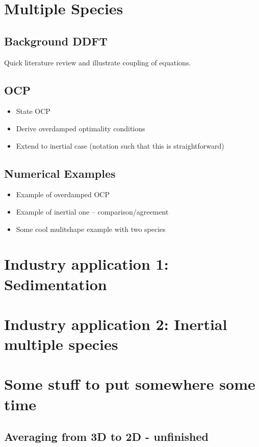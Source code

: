 \documentclass[11pt, a4paper]{article}
\theoremstyle{definition}
\begin{document}
	\section{Multiple Species}
	
	\subsection{Background DDFT}
	Quick literature review and illustrate coupling of equations.
	
	\subsection{OCP}
	
	\begin{itemize}
		\item State OCP
		\item Derive overdamped optimality conditions
		\item Extend to inertial case (notation such that this is straightforward)
	\end{itemize}
	
	\subsection{Numerical Examples}
	\begin{itemize}
		\item Example of overdamped OCP
		\item Example of inertial one -- comparison/agreement
		\item Some cool mulitshape example with two species
	\end{itemize}


	\section{Industry application 1: Sedimentation}
	\section{Industry application 2: Inertial multiple species}
	
	
	
	\section{Some stuff to put somewhere some time}
	

	
	
	\subsection{Averaging from 3D to 2D - unfinished}
	

	
	\pagebreak	
	
	
	
	
\end{document}
